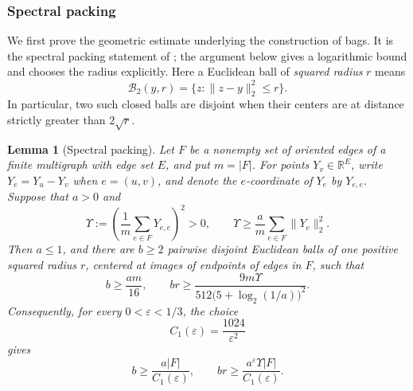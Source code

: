 \documentclass[11pt]{amsart}
\newcommand{\R}{\mathbb R}
\newtheorem{lemma}[theorem]{Lemma}
\theoremstyle{definition}
\theoremstyle{remark}
\numberwithin{equation}{section}
\begin{document}
\subsubsection{Spectral packing}
\label{hb:spectral-subsection}

We first prove the geometric estimate underlying the construction of
bags.  It is the spectral packing statement of
\cite[Lemma~6.4]{AOG}; the argument below gives a logarithmic bound and
chooses the radius explicitly.
Here a Euclidean ball of \emph{squared radius} \(r\) means
\[
 \mathcal B_2(y,r)=\{z:\|z-y\|_2^2\le r\}.
\]
In particular, two such closed balls are disjoint when their centers
are at distance strictly greater than \(2\sqrt r\).

\begin{lemma}[Spectral packing]\label{hb:spectral-packing}
Let \(F\) be a nonempty set of oriented edges of a finite multigraph
with edge set \(E\), and put \(m=|F|\).
For points \(Y_v\in\R^E\), write
\(Y_e=Y_u-Y_v\) when \(e=(u,v)\), and denote the \(e\)-coordinate of
\(Y_e\) by \(Y_{e,e}\).
Suppose that \(a>0\) and
\begin{equation}\label{hb:spectral-assumption}
 \Upsilon:=\left(\frac1m\sum_{e\in F}Y_{e,e}\right)^2>0,
 \qquad
 \Upsilon\ge\frac a m\sum_{e\in F}\|Y_e\|_2^2.
\end{equation}
Then \(a\le1\), and there are \(b\ge2\) pairwise disjoint Euclidean
balls of one positive squared radius \(r\), centered at images of
endpoints of edges in \(F\), such that
\begin{equation}\label{hb:spectral-logarithmic}
 b\ge\frac{am}{16},
 \qquad
 br\ge\frac{9m\Upsilon}
 {512\bigl(5+\log_2(1/a)\bigr)^2}.
\end{equation}
Consequently, for every \(0<\varepsilon<1/3\), the choice
\begin{equation}\label{hb:spectral-constant}
 C_1(\varepsilon)=\frac{1024}{\varepsilon^2}
\end{equation}
gives
\begin{equation}\label{hb:spectral-conclusion}
 b\ge\frac{a|F|}{C_1(\varepsilon)},
 \qquad
 br\ge\frac{a^\varepsilon\Upsilon|F|}{C_1(\varepsilon)}.
\end{equation}
\end{lemma}
\end{document}
